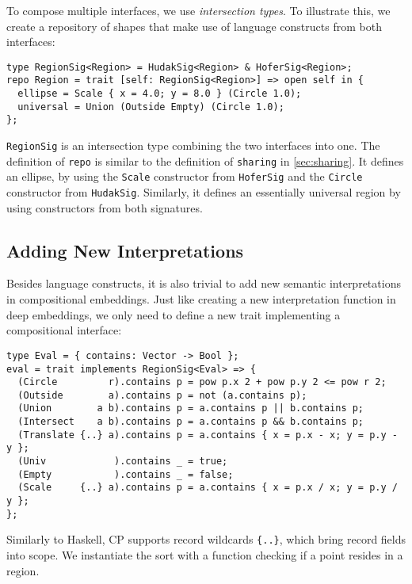 \noindent
To compose multiple interfaces, we use \emph{intersection types}. To illustrate
this, we create a repository of shapes that make use of language constructs from
both interfaces:

\begin{lstlisting}
type RegionSig<Region> = HudakSig<Region> & HoferSig<Region>;
repo Region = trait [self: RegionSig<Region>] => open self in {
  ellipse = Scale { x = 4.0; y = 8.0 } (Circle 1.0);
  universal = Union (Outside Empty) (Circle 1.0);
};
\end{lstlisting}

\noindent
\lstinline{RegionSig} is an intersection type combining the two interfaces into
one. The definition of \lstinline{repo} is similar to the definition of
\lstinline{sharing} in \autoref{sec:sharing}. It defines an ellipse, by using
the \lstinline{Scale} constructor from \lstinline{HoferSig} and the
\lstinline{Circle} constructor from \lstinline{HudakSig}. Similarly, it defines
an essentially universal region by using constructors from both signatures.

\subsection{Adding New Interpretations} \label{sec:semantics}

Besides language constructs, it is also trivial to add new semantic
interpretations in compositional embeddings. Just like creating a new
interpretation function in deep embeddings, we only need to define a new trait
implementing a compositional interface:

\begin{lstlisting}
type Eval = { contains: Vector -> Bool };
eval = trait implements RegionSig<Eval> => {
  (Circle         r).contains p = pow p.x 2 + pow p.y 2 <= pow r 2;
  (Outside        a).contains p = not (a.contains p);
  (Union        a b).contains p = a.contains p || b.contains p;
  (Intersect    a b).contains p = a.contains p && b.contains p;
  (Translate {..} a).contains p = a.contains { x = p.x - x; y = p.y - y };
  (Univ            ).contains _ = true;
  (Empty           ).contains _ = false;
  (Scale     {..} a).contains p = a.contains { x = p.x / x; y = p.y / y };
};
\end{lstlisting}

\noindent
Similarly to Haskell, CP supports record wildcards \lstinline|{..}|, which bring
record fields into scope. We instantiate the sort with a function checking if a
point resides in a region.

